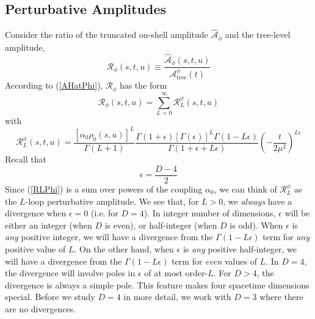 \subsection{Perturbative Amplitudes}
Consider the ratio of the truncated on-shell amplitude $\widehat{\mathcal{A}}_{\phi}$ and the tree-level amplitude,
\begin{equation}
	\mathcal{R}_{\phi}(s, t, u) \equiv \frac{\widehat{\mathcal{A}}_{\phi}(s, t, u)}{\mathcal{A}_{\text{tree}}^{\phi}(t)}
\end{equation}
According to (\ref{AHatPhi}), $\mathcal{R}_{\phi}$ has the form
\begin{equation}
	\mathcal{R}_{\phi}(s, t, u) = \sum_{L = 0}^{\infty} \mathcal{R}_{L}^{\phi}(s, t, u)
\end{equation}
with
\begin{equation}
	\mathcal{R}_{L}^{\phi}(s, t, u) = \frac{[\alpha_{0} \rho_{0}(s, u)]^{L}}{\Gamma(L + 1)} \frac{\Gamma(1 + \epsilon) [\Gamma(\epsilon)]^{L} \Gamma(1 - L \epsilon)}{\Gamma(1 + \epsilon + L \epsilon)} \left( -\frac{t}{2 \mu^{2}} \right)^{L \epsilon} \label{RLPhi}
\end{equation}
Recall that
\begin{equation}
	\epsilon = \frac{D - 4}{2}
\end{equation}
Since (\ref{RLPhi}) is a sum over powers of the coupling $\alpha_{0}$, we can think of $\mathcal{R}_{L}^{\phi}$ as the $L$-loop perturbative amplitude. We see that, for $L > 0$, we \textit{always} have a divergence when $\epsilon = 0$ (i.e. for $D = 4$). In integer number of dimensions, $\epsilon$ will be either an integer (when $D$ is even), or half-integer (when $D$ is odd). When $\epsilon$ is \textit{any} positive integer, we will have a divergence from the $\Gamma(1 - L \epsilon)$ term for \textit{any} positive value of $L$. On the other hand, when $\epsilon$ is \textit{any} positive half-integer, we will have a divergence from the $\Gamma(1 - L \epsilon)$ term for \textit{even} values of $L$. In $D = 4$, the divergence will involve poles in $\epsilon$ of at most order-$L$. For $D > 4$, the divergence is always a simple pole. This feature makes four spacetime dimensions special. Before we study $D = 4$ in more detail, we work with $D = 3$ where there are no divergences.
